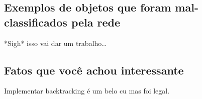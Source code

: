 \documentclass[twocolumn]{article}
\begin{document}
    \subsection{Exemplos de objetos que foram mal-classificados pela rede}

    *Sigh* isso vai dar um trabalho\ldots

    \subsection{Fatos que você achou interessante}

    Implementar backtracking é um belo cu mas foi legal.

    
    
    \nocite{*}
\end{document}
